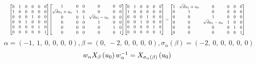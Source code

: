 \documentclass[11pt]{article}
\theoremstyle{definition}
\begin{document}
\[
\scaletoalign{\textwidth}{{\left[\begin{matrix}0 & 1 & 0 & 0 & 0 & 0\\1 & 0 & 0 & 0 & 0 & 0\\0 & 0 & 0 & 1 & 0 & 0\\0 & 0 & 1 & 0 & 0 & 0\\0 & 0 & 0 & 0 & 1 & 0\\0 & 0 & 0 & 0 & 0 & 1\end{matrix}\right]} {\left[\begin{matrix}1 & 0 & 0 & 0 & 0 & 0\\\sqrt{d} u_{1} + u_{0} & 1 & 0 & 0 & 0 & 0\\0 & 0 & 1 & \sqrt{d} u_{1} - u_{0} & 0 & 0\\0 & 0 & 0 & 1 & 0 & 0\\0 & 0 & 0 & 0 & 1 & 0\\0 & 0 & 0 & 0 & 0 & 1\end{matrix}\right]} {\left[\begin{matrix}0 & 1 & 0 & 0 & 0 & 0\\1 & 0 & 0 & 0 & 0 & 0\\0 & 0 & 0 & 1 & 0 & 0\\0 & 0 & 1 & 0 & 0 & 0\\0 & 0 & 0 & 0 & 1 & 0\\0 & 0 & 0 & 0 & 0 & 1\end{matrix}\right]} = {\left[\begin{matrix}1 & \sqrt{d} u_{1} + u_{0} & 0 & 0 & 0 & 0\\0 & 1 & 0 & 0 & 0 & 0\\0 & 0 & 1 & 0 & 0 & 0\\0 & 0 & \sqrt{d} u_{1} - u_{0} & 1 & 0 & 0\\0 & 0 & 0 & 0 & 1 & 0\\0 & 0 & 0 & 0 & 0 & 1\end{matrix}\right]}}
\]
\[
\alpha = \left( -1, \  1, \  0, \  0, \  0, \  0\right), \beta = \left( 0, \  -2, \  0, \  0, \  0, \  0\right), \sigma_{\alpha}(\beta) = \left( -2, \  0, \  0, \  0, \  0, \  0\right)
\]
\[
\scaletoalign{\textwidth}{w_{\alpha} X_{\beta}\left(u_{0}\right) w_{\alpha}^{-1} = X_{\sigma_{\alpha}\left(\beta\right)}\left(u_{0}\right)}
\]
\end{document}
